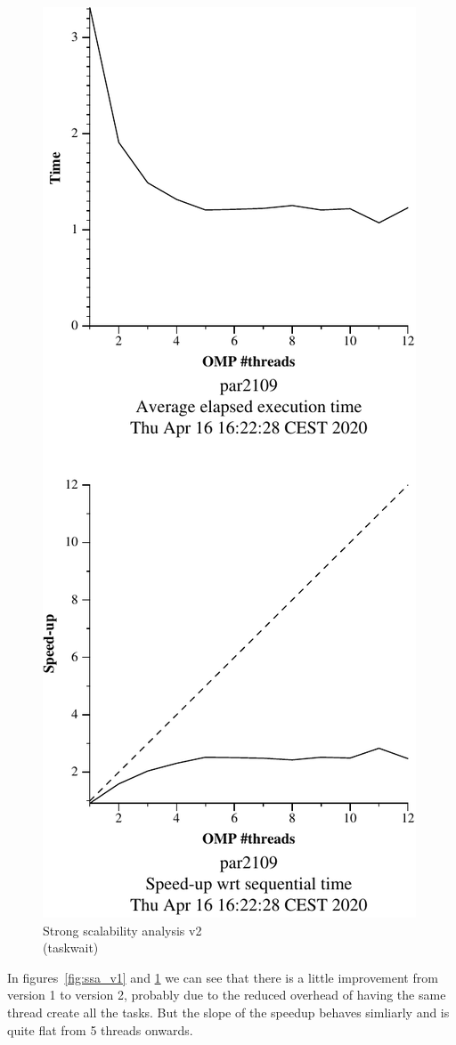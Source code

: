 \begin{figure}[H]
\begin{minipage}{0.5\textwidth}
        \label{fig:ssa_v1} 
    \end{minipage}
    \begin{minipage}{0.5\textwidth}
        \centering
        \includegraphics[width=0.7\linewidth]{plots/v2-crop.pdf}
        \caption{Strong scalability analysis v2 \\ (taskwait)}
        \label{fig:ssa_v2} 
    \end{minipage}
\end{figure}

In figures~\ref{fig:ssa_v1} and \ref{fig:ssa_v2} we can see that there is a little improvement
from version 1 to version 2, probably due to the reduced overhead of having the same thread create all the
tasks. But the slope of the speedup behaves simliarly and is quite flat from 5 threads onwards.

